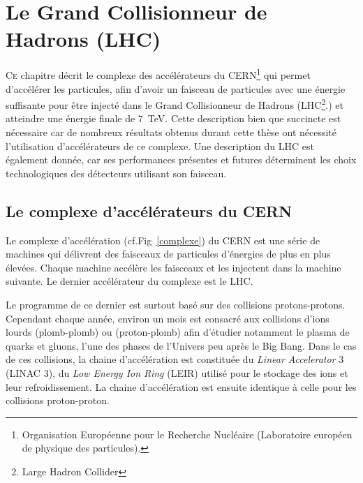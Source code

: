 \chapter{Le Grand Collisionneur de Hadrons (LHC)}
\renewcommand\chapterillustration{LHC/lhc}
\ThisULCornerWallPaper{1}{\chapterillustration}
\minitoc
\lettrine[lines=4, slope=-0.5em]{C}{e} chapitre décrit le complexe des accélérateurs du CERN\footnote{Organisation Européenne pour le Recherche Nucléaire (Laboratoire européen de physique des particules).} qui permet d'accélérer les particules, afin d'avoir un faisceau de particules avec une énergie suffisante pour être injecté dans le Grand Collisionneur de Hadrons (LHC\footnote{Large Hadron Collider}.) et atteindre une énergie finale de \SI{7}{\tera\eV}. Cette description bien que succincte est nécessaire car de nombreux résultats obtenus durant cette thèse ont nécessité l'utilisation d'accélérateurs de ce complexe. Une description du LHC est également donnée, car ses performances présentes et futures déterminent les choix technologiques des détecteurs utilisant son faisceau.

\section{Le complexe d'accélérateurs du CERN}

Le complexe d'accélération (cf.Fig~\ref{complexe}) du CERN est une série de machines qui délivrent des faisceaux de particules d'énergies de plus en plus élevées. Chaque machine accélère les faisceaux et les injectent dans la machine suivante. Le dernier accélérateur du complexe est le LHC.

Le programme de ce dernier est surtout basé sur des collisions protons-protons. Cependant chaque année, environ un mois est consacré aux collisions d'ions lourds (plomb-plomb) ou (proton-plomb) afin d'étudier notamment le plasma de quarks et gluons, l'une des phases de l'Univers peu après le Big Bang. Dans le cas de ces collisions, la chaine d'accélération est constituée du \textit{Linear Accelerator} \num{3} (LINAC \num{3}), du \textit{Low Energy Ion Ring} (LEIR) utilisé pour le stockage des ions et leur refroidissement. La chaine d'accélération est ensuite identique à celle pour les collisions proton-proton.


